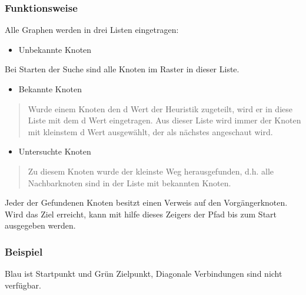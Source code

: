 \subsubsection{Funktionsweise}

Alle Graphen werden in drei Listen eingetragen:

\begin{itemize}
\item Unbekannte Knoten
\end{itemize}

Bei Starten der Suche sind alle Knoten im Raster in dieser Liste.

\begin{itemize}
\item Bekannte Knoten
\end{itemize}

\begin{quote}
Wurde einem Knoten den d Wert der Heuristik zugeteilt, wird er in diese
Liste mit dem d Wert eingetragen. Aus dieser Liste wird immer der Knoten
mit kleinstem d Wert ausgewählt, der als nächstes angeschaut wird.
\end{quote}

\begin{itemize}
\item Untersuchte Knoten
\end{itemize}

\begin{quote}
Zu diesem Knoten wurde der kleinste Weg herausgefunden, d.h. alle
Nachbarknoten sind in der Liste mit bekannten Knoten.
\end{quote}

Jeder der Gefundenen Knoten besitzt einen Verweis auf den
Vorgängerknoten. Wird das Ziel erreicht, kann mit hilfe dieses Zeigers
der Pfad bis zum Start ausgegeben werden.
\cite[Schmidt, Fuchs]{asterngeo}

\subsubsection{Beispiel}

Blau ist Startpunkt und Grün Zielpunkt, Diagonale Verbindungen sind
nicht verfügbar.



